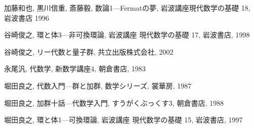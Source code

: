 \documentclass[12pt,twoside]{jarticle}
\begin{document}

\begin{thebibliography}{AB}

加藤和也, 黒川信重, 斎藤毅, 数論1---Fermatの夢, 岩波講座現代数学の基礎 18,
岩波書店 1996

谷崎俊之, 環と体3---非可換環論, 岩波講座 現代数学の基礎 17, 岩波書店, 1998

谷崎俊之, リー代数と量子群, 共立出版株式会社, 2002

永尾汎, 代数学, 新数学講座4, 朝倉書店, 1983

堀田良之, 代数入門---群と加群, 数学シリーズ, 裳華房, 1987

堀田良之, 加群十話---代数学入門, すうがくぶっくす3, 朝倉書店, 1988

堀田良之, 環と体1---可換環論, 岩波講座 現代数学の基礎 15, 岩波書店, 1997

\end{thebibliography}

\end{document}

